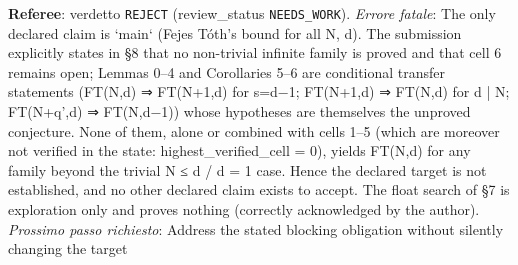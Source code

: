 \documentclass[11pt,a4paper]{article}
\begin{document}
\begin{description}
\textbf{Referee}: verdetto \texttt{REJECT} (review\_status \texttt{NEEDS\_WORK}).
\emph{Errore fatale}: The only declared claim is `main` (Fejes Tóth's bound for all N, d). The submission explicitly states in §8 that no non-trivial infinite family is proved and that cell 6 remains open; Lemmas 0–4 and Corollaries 5–6 are conditional transfer statements (FT(N,d) ⇒ FT(N+1,d) for s=d−1; FT(N+1,d) ⇒ FT(N,d) for d | N; FT(N+q',d) ⇒ FT(N,d−1)) whose hypotheses are themselves the unproved conjecture. None of them, alone or combined with cells 1–5 (which are moreover not verified in the state: highest\_verified\_cell = 0), yields FT(N,d) for any family beyond the trivial N ≤ d / d = 1 case. Hence the declared target is not established, and no other declared claim exists to accept. The float search of §7 is exploration only and proves nothing (correctly acknowledged by the author).
\emph{Prossimo passo richiesto}: Address the stated blocking obligation without silently changing the target
\end{description}
\end{document}
